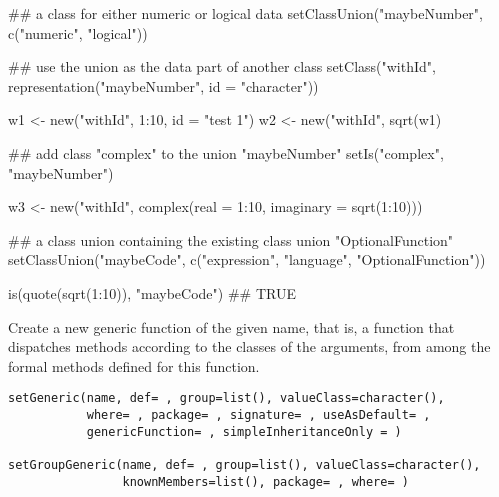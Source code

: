 \begin{Examples}
\begin{ExampleCode}
## a class for either numeric or logical data
setClassUnion("maybeNumber", c("numeric", "logical"))

## use the union as the data part of another class
setClass("withId", representation("maybeNumber", id = "character"))

w1 <- new("withId", 1:10, id = "test 1")
w2 <- new("withId", sqrt(w1)%

## add class "complex" to the union "maybeNumber"
setIs("complex", "maybeNumber")

w3 <- new("withId", complex(real = 1:10, imaginary = sqrt(1:10)))

## a class union containing the existing class  union "OptionalFunction"
setClassUnion("maybeCode",
    c("expression", "language", "OptionalFunction"))

is(quote(sqrt(1:10)), "maybeCode")  ## TRUE


\end{ExampleCode}
\end{Examples}
%
\begin{Description}\relax
Create a new generic function of the given name, that is, a function
that dispatches methods according to the classes of the arguments,
from among the formal methods defined for this function.
\end{Description}
%
\begin{Usage}
\begin{verbatim}
setGeneric(name, def= , group=list(), valueClass=character(),
           where= , package= , signature= , useAsDefault= ,
           genericFunction= , simpleInheritanceOnly = )

setGroupGeneric(name, def= , group=list(), valueClass=character(),
                knownMembers=list(), package= , where= )
\end{verbatim}
\end{Usage}
%
